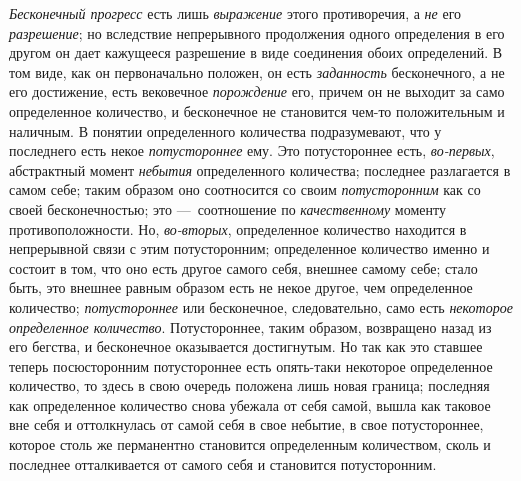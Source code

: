 {\em Бесконечный прогресс} есть лишь
{\em выражение} этого противоречия, а
{\em не} его {\em разрешение}; но
вследствие непрерывного продолжения одного определения в его другом он дает
кажущееся разрешение в виде соединения обоих определений. В том виде, как
он первоначально положен, он есть {\em заданность}
бесконечного, а не его достижение, есть вековечное
{\em порождение} его, причем он не выходит за само
определенное количество, и бесконечное не становится чем-то положительным и
наличным. В понятии определенного количества подразумевают, что у
последнего есть некое {\em потустороннее} ему. Это
потустороннее есть, {\em во-первых}, абстрактный момент
{\em небытия} определенного количества; последнее
разлагается в самом себе; таким образом оно соотносится со своим
{\em потусторонним} как со своей бесконечностью; это
—~соотношение по {\em качественному} моменту
противоположности. Но, {\em во-вторых}, определенное
количество находится в непрерывной связи с этим потусторонним; определенное
количество именно и состоит в том, что оно есть другое самого себя, внешнее
самому себе; стало быть, это внешнее равным образом есть не некое другое,
чем определенное количество; {\em потустороннее} или
бесконечное, следовательно, само есть {\em некоторое
определенное количество}. Потустороннее, таким образом, возвращено назад из
его бегства, и бесконечное оказывается достигнутым. Но так как это ставшее
теперь посюсторонним потустороннее есть опять-таки некоторое определенное
количество, то здесь в свою очередь положена лишь новая граница; последняя
как определенное количество снова убежала от себя самой, вышла как таковое
вне себя и оттолкнулась от самой себя в свое небытие, в свое потустороннее,
которое столь же перманентно становится определенным количеством, сколь и
последнее отталкивается от самого себя и становится потусторонним.

